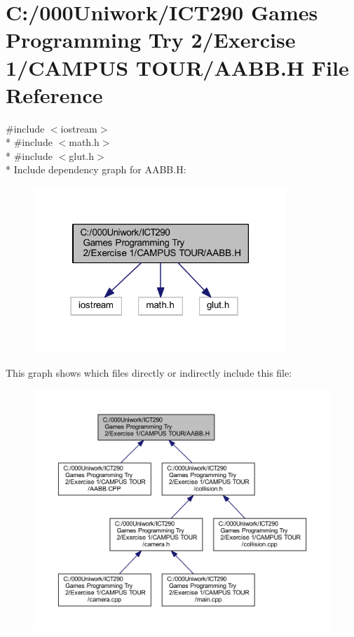 \hypertarget{_a_a_b_b_8_h}{}\section{C\+:/000\+Uniwork/\+I\+C\+T290 Games Programming Try 2/\+Exercise 1/\+C\+A\+M\+P\+US T\+O\+U\+R/\+A\+A\+BB.H File Reference}
\label{_a_a_b_b_8_h}
{\ttfamily \#include $<$iostream$>$}\\*
{\ttfamily \#include $<$math.\+h$>$}\\*
{\ttfamily \#include $<$glut.\+h$>$}\\*
Include dependency graph for A\+A\+B\+B.\+H\+:
\nopagebreak
\begin{figure}[H]
\begin{center}
\leavevmode
\includegraphics[width=270pt]{_a_a_b_b_8_h__incl}
\end{center}
\end{figure}
This graph shows which files directly or indirectly include this file\+:
\nopagebreak
\begin{figure}[H]
\begin{center}
\leavevmode
\includegraphics[width=350pt]{_a_a_b_b_8_h__dep__incl}
\end{center}
\end{figure}
